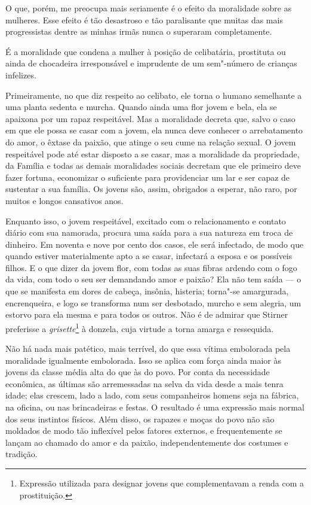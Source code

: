 
O que, porém, me preocupa mais seriamente é o efeito da moralidade sobre
as mulheres. Esse efeito é tão desastroso e tão paralisante que muitas
das mais progressistas dentre as minhas irmãs nunca o superaram
completamente.

É a moralidade que condena a mulher à posição de celibatária, prostituta
ou ainda de chocadeira irresponsável e imprudente de um sem"-número de
crianças infelizes.

Primeiramente, no que diz respeito ao celibato, ele torna o humano
semelhante a uma planta sedenta e murcha. Quando ainda uma flor jovem e
bela, ela se apaixona por um rapaz respeitável. Mas a moralidade decreta
que, salvo o caso em que ele possa se casar com a jovem, ela nunca deve
conhecer o arrebatamento do amor, o êxtase da paixão, que atinge o seu
cume na relação sexual. O jovem respeitável pode até estar disposto a se
casar, mas a moralidade da propriedade, da Família e todas as demais
moralidades sociais decretam que ele primeiro deve fazer fortuna,
economizar o suficiente para providenciar um lar e ser capaz de
sustentar a sua família. Os jovens são, assim, obrigados a esperar, não
raro, por muitos e longos cansativos anos.

Enquanto isso, o jovem respeitável, excitado com o relacionamento e
contato diário com sua namorada, procura uma saída para a sua natureza em
troca de dinheiro. Em noventa e nove por cento dos casos, ele será
infectado, de modo que quando estiver materialmente apto a se casar,
infectará a esposa e os possíveis filhos. E o que dizer da jovem flor,
com todas as suas fibras ardendo com o fogo da vida, com todo o seu ser
demandando amor e paixão? Ela não tem saída --- o que se manifesta em
dores de cabeça, insônia, histeria; torna"-se amargurada, encrenqueira, e
logo se transforma num ser desbotado, murcho e sem alegria, um estorvo
para ela mesma e para todos os outros. Não é de admirar que Stirner
preferisse a \emph{grisette}\footnote{Expressão utilizada para designar
  jovens que complementavam a renda com a prostituição.} à donzela, cuja
virtude a torna amarga e ressequida.

Não há nada mais patético, mais terrível, do que essa vítima embolorada
pela moralidade igualmente embolorada. Isso se aplica com força ainda
maior às jovens da classe média alta do que às do povo. Por conta da
necessidade econômica, as últimas são arremessadas na selva da vida
desde a mais tenra idade; elas crescem, lado a lado, com seus
companheiros homens seja na fábrica, na oficina, ou nas brincadeiras e
festas. O resultado é uma expressão mais normal dos seus instintos
físicos. Além disso, os rapazes e moças do povo não são moldados de modo
tão inflexível pelos fatores externos, e frequentemente se lançam ao
chamado do amor e da paixão, independentemente dos costumes e tradição.

